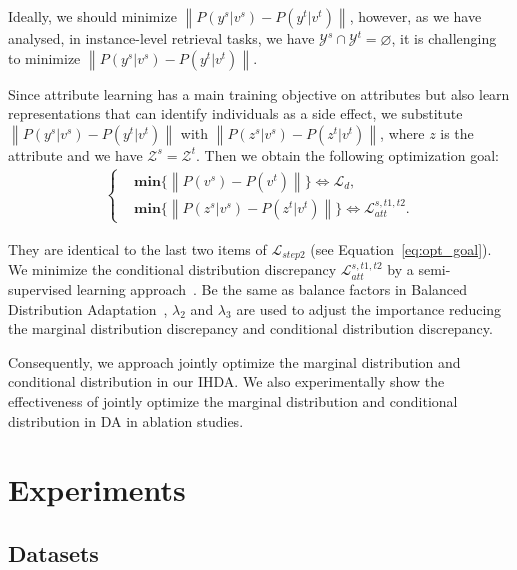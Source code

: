 \documentclass[journal]{IEEEtran}
\begin{document}
Ideally, we should minimize $\left \|P(y^{s}|v^{s})-P(y^{t}|v^{t})\right \|$, however, as we have analysed, in instance-level retrieval tasks, we have $\mathcal{Y}^{s} \cap \mathcal{Y}^{t} = \varnothing$, it is challenging to minimize $\left \|P(y^{s}|v^{s})-P(y^{t}|v^{t})\right \|$. 

Since attribute learning has a main training objective on attributes but also learn representations that can identify individuals as a side effect, we substitute $\left \|P(y^{s}|v^{s})-P(y^{t}|v^{t})\right \|$ with $\left \|P(z^{s}|v^{s})-P(z^{t}|v^{t})\right \|$, where $z$ is the attribute and we have $\mathcal{Z}^{s}=\mathcal{Z}^{t}$. Then we obtain the following optimization goal:
\begin{equation}
\begin{split}
\left\{\begin{matrix}
&\textbf{min}\{\left \|P(v^{s})-P(v^{t})\right \|\} \Leftrightarrow 
\mathcal{L}_{d}, \\
&\textbf{min}\{\left \|P(z^{s}|v^{s})-P(z^{t}|v^{t})\right \|\}
\Leftrightarrow \mathcal{L}^{s,t1,t2}_{att}.
\end{matrix}\right.
\label{eq:real_goal}
\end{split}
\end{equation}

They are identical to the last two items of $\mathcal{L}_{step2}$ (see Equation~\ref{eq:opt_goal}).
We minimize the conditional distribution discrepancy $\mathcal{L}^{s,t1,t2}_{att}$ by a semi-supervised learning approach~\cite{grandvalet2005semi,saito2019semi}. Be the same as balance factors in Balanced Distribution Adaptation~\cite{wang2017balanced}, $\lambda_2$ and $\lambda_3$ are used to adjust the importance reducing the marginal distribution discrepancy and conditional distribution discrepancy.

Consequently, we approach jointly optimize the marginal distribution and conditional distribution in our IHDA. 
We also experimentally show the effectiveness of jointly optimize the marginal distribution and conditional distribution in DA in ablation studies. 


\section{Experiments}
\label{sec:experiments}

\subsection{Datasets}
\end{document}
